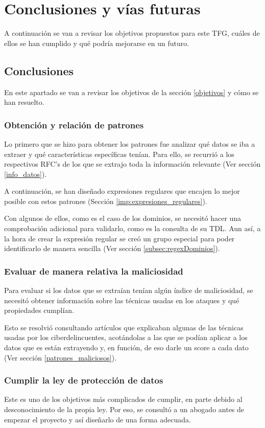 \chapter{Conclusiones y vías futuras}
A continuación se van a revisar los objetivos propuestos para este TFG, cuáles de ellos se han cumplido y qué podría mejorarse en un futuro.

\section{Conclusiones}
En este apartado se van a revisar los objetivos de la sección \ref{objetivos} y cómo se han resuelto. 

\subsection{Obtención y relación de patrones}

Lo primero que se hizo para obtener los patrones fue analizar qué datos se iba a extraer y qué características específicas tenían. Para ello, se recurrió a los respectivos RFC’s de los que se extrajo toda la información relevante (Ver sección \ref{info_datos}). 

A continuación, se han diseñado expresiones regulares que encajen lo mejor posible con estos patrones (Sección \ref{imp:expresiones_regulares}). 

Con algunos de ellos, como es el caso de los dominios, se necesitó hacer una comprobación adicional para validarlo, como es la consulta de su TDL. Aun así, a la hora de crear la expresión regular se creó un grupo especial para poder identificarlo de manera sencilla (Ver sección \ref{subsec:regexDominios}). 

\subsection{Evaluar de manera relativa la maliciosidad}
Para evaluar si los datos que se extraían tenían algún índice de maliciosidad, se necesitó obtener información sobre las técnicas usadas en los ataques y qué propiedades cumplían. 

Esto se resolvió consultando artículos que explicaban algunas de las técnicas usadas por los ciberdelincuentes, acotándolas  a las que se podían aplicar a los datos que es están extrayendo y, en función, de eso darle un score a cada dato (Ver sección \ref{patrones_maliciosos}). 

\subsection{Cumplir la ley de protección de datos}
Este es uno de los objetivos más complicados de cumplir, en parte debido al desconocimiento de la propia ley. Por eso, se consultó a un abogado antes de empezar el proyecto y así diseñarlo de una forma adecuada.  

